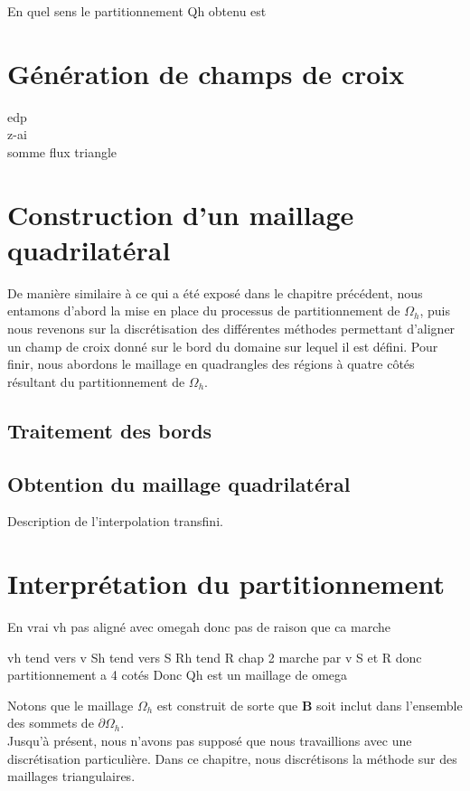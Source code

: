 En quel sens le partitionnement Qh obtenu est 


\section{Génération de champs de croix}
edp\\
z-ai\\
somme flux triangle

\section*{Construction d'un maillage quadrilatéral}
De manière similaire à ce qui a été exposé dans le chapitre précédent, nous entamons d'abord la mise en place du processus de partitionnement de $\Omega_h$, puis nous revenons sur la discrétisation des différentes méthodes permettant d'aligner un champ de croix donné sur le bord du domaine sur lequel il est défini. Pour finir, nous abordons le maillage en quadrangles des régions à quatre côtés résultant du partitionnement de $\Omega_h$.


\subsection*{Traitement des bords}

\subsection*{Obtention du maillage quadrilatéral}
Description de l'interpolation transfini.

\section*{Interprétation du partitionnement}
En vrai vh pas aligné avec omegah donc pas de raison que ca marche

vh tend vers v
Sh tend vers S
Rh tend R
chap 2 marche par v S et R donc partitionnement a 4 cotés
Donc Qh est un maillage de omega



Notons que le maillage $\Omega_h$ est construit de sorte que $\mathbf{B}$ soit inclut dans l'ensemble des sommets de $\partial\Omega_h$.\\

Jusqu'à présent, nous n'avons pas supposé que nous travaillions avec une discrétisation particulière. Dans ce chapitre, nous discrétisons la méthode sur des maillages triangulaires.

